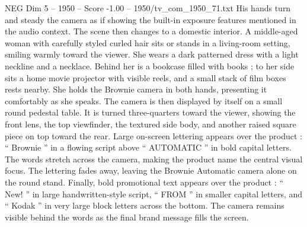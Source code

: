 \begin{textsample}{NEG Dim 5 – 1950 – Score -1.00 – 1950/tv\_com\_1950\_71.txt}
His hands turn and steady the camera as if showing the built-in exposure features mentioned in the audio context.
The scene then changes to a domestic interior.
A middle-aged woman with carefully styled curled hair sits or stands in a living-room setting, smiling warmly toward the viewer.
She wears a dark patterned dress with a light neckline and a necklace.
Behind her is a bookcase filled with books ; to her side sits a home movie projector with visible reels, and a small stack of film boxes rests nearby.
She holds the Brownie camera in both hands, presenting it comfortably as she speaks.
The camera is then displayed by itself on a small round pedestal table.
It is turned three-quarters toward the viewer, showing the front lens, the top viewfinder, the textured side body, and another raised square piece on top toward the rear.
Large on-screen lettering appears over the product : “ Brownie ” in a flowing script above “ AUTOMATIC ” in bold capital letters.
The words stretch across the camera, making the product name the central visual focus.
The lettering fades away, leaving the Brownie Automatic camera alone on the round stand.
Finally, bold promotional text appears over the product : “ New! ” in large handwritten-style script, “ FROM ” in smaller capital letters, and “ Kodak ” in very large block letters across the bottom.
The camera remains visible behind the words as the final brand message fills the screen.

\end{textsample}
